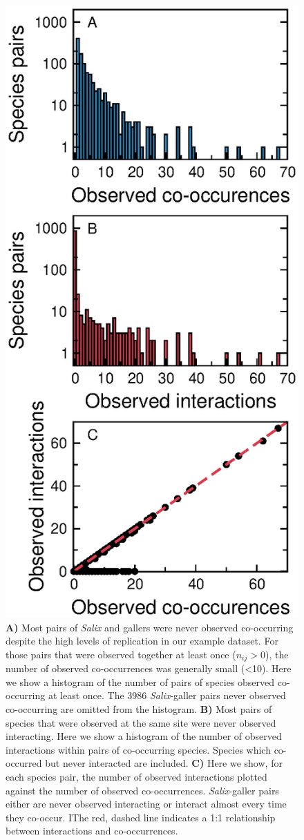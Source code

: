 \documentclass[12pt]{article}
\begin{document}
      \begin{figure}[h!]
          \caption{\textbf{A)} Most pairs of \emph{Salix} and gallers were never observed co-occurring despite the high levels of replication in our example dataset. For those pairs that were observed together at least once ($n_{ij}>0$), the number of observed co-occurrences was generally small (\textless10). Here we show a histogram of the number of pairs of species observed co-occurring at least once. The 3986 \emph{Salix}-galler pairs never observed co-occurring are omitted from the histogram. \textbf{B)} Most pairs of species that were observed at the same site were never observed interacting. Here we show a histogram of the number of observed interactions within pairs of co-occurring species. Species which co-occurred but never interacted are included. \textbf{C)} Here we show, for each species pair, the number of observed interactions plotted against the number of observed co-occurrences. \emph{Salix}-galler pairs either are never observed interacting or interact almost every time they co-occur. IThe red, dashed line indicates a 1:1 relationship between interactions and co-occurrences.}
          \label{histograms}
          \begin{center}
          \includegraphics*[width=.8\textwidth]{figures/SG_histogram.eps}

\end{center}
\end{figure}
\end{document}
